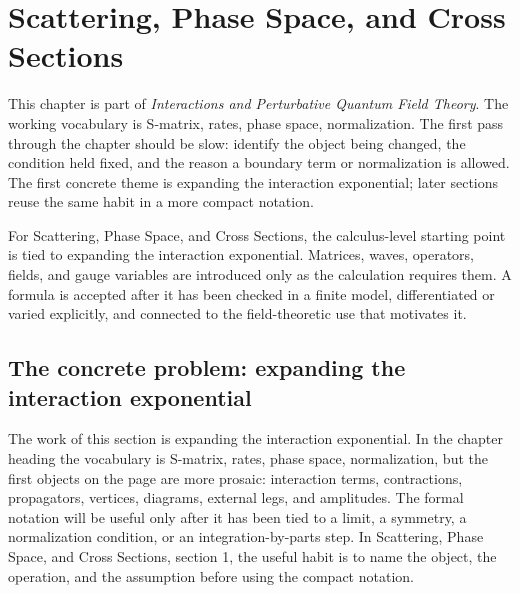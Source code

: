\chapter{Scattering, Phase Space, and Cross Sections}


This chapter is part of \emph{Interactions and Perturbative Quantum Field Theory}.  The working vocabulary is S-matrix, rates, phase space, normalization.  The first pass through the chapter should be slow: identify the object being changed, the condition held fixed, and the reason a boundary term or normalization is allowed.  The first concrete theme is expanding the interaction exponential; later sections reuse the same habit in a more compact notation.

For Scattering, Phase Space, and Cross Sections, the calculus-level starting point is tied to expanding the interaction exponential.  Matrices, waves, operators, fields, and gauge variables are introduced only as the calculation requires them.  A formula is accepted after it has been checked in a finite model, differentiated or varied explicitly, and connected to the field-theoretic use that motivates it.

\section{The concrete problem: expanding the interaction exponential}













The work of this section is expanding the interaction exponential.  In the chapter heading the vocabulary is S-matrix, rates, phase space, normalization, but the first objects on the page are more prosaic: interaction terms, contractions, propagators, vertices, diagrams, external legs, and amplitudes.  The formal notation will be useful only after it has been tied to a limit, a symmetry, a normalization condition, or an integration-by-parts step.  In Scattering, Phase Space, and Cross Sections, section 1, the useful habit is to name the object, the operation, and the assumption before using the compact notation.

